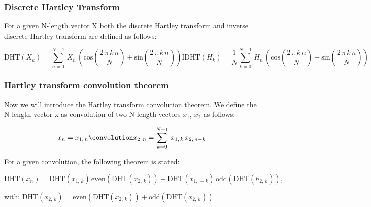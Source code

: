 \documentclass[12pt,twoside,a4paper]{article}
\numberwithin{equation}{subsection}
\numberwithin{figure}{subsection}
\begin{document}
\subsubsection*{Discrete Hartley Transform}

For a given N-length vector X both the discrete Hartley transform and inverse discrete Hartley transform are defined as follows:

\begin{subequations} \label{eq:fhta_definition}
  \begin{equation}   \label{eq:fhtadef_dht}
    \mathrm{DHT}(X_k) = \sum_{n = 0}^{N - 1} \, X_n \, (
      \mathrm{cos} \left(\frac {2 \, \pi \, k \, n}{N} \right) 
    + \mathrm{sin} \left(\frac {2 \, \pi \, k \, n}{N} \right) )
  \end{equation}
  \begin{equation}   \label{eq:fhtadef_idht}
    \mathrm{IDHT}({H_{k}})= \frac {1}{N} \sum_{k = 0}^{N - 1} \, H_n \, (
    	\mathrm{cos} \left( \frac {2 \, \pi \, k \, n}{N} \right) 
      + \mathrm{sin} \left( \frac {2 \, \pi \, k \, n}{N} \right) ) 
  \end{equation}
\end{subequations}

\subsubsection*{Hartley transform convolution theorem}

Now we will introduce the Hartley transform convolution theorem. We define the N-length vector x as convolution of two N-length
vectors ${x_{1}}$, ${x_{2}}$ as follows:

\begin{equation} \label{eq:hartley_convolution}
  x_n = x_{1, \,n} \convolution x_{2, \,n} = \sum_{k = 0}^{N - 1} \, x_{1, \, k} \, x_{2, \, n - k} 
\end{equation}

For a given convolution, the following theorem is stated:

\begin{equation} \label{eq:hartley_theorem}
  \mathrm{DHT}(x_n) = \mathrm{DHT}(x_{1, \,  k}) \, \mathrm{even}(\mathrm{DHT}(x_{2, \, k})) 
                    + \mathrm{DHT}(x_{1, \, -k}) \, \mathrm{odd} (\mathrm{DHT}(h_{2, \, k})),
\end{equation}

with: $\mathrm{DHT}(x_{2, \,k}) = \mathrm{even}(\mathrm{DHT}(x_{2, \,k})) 
                                 + \mathrm{odd} (\mathrm{DHT}(x_{2, \,k}))$
\end{document}
